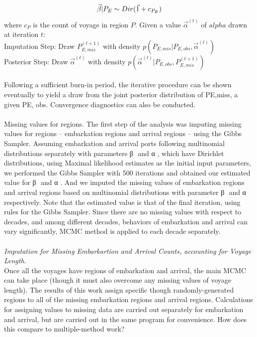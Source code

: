 \documentclass[preprint,12pt]{elsarticle}
\begin{document}
\begin{equation}
\vec{\beta}|P_E \sim Dir(\vec{1}+c_{P_E})\\
\end{equation}
where $c_P$ is the count of voyage in region $P$. Given a value $\vec{\alpha}^{(t)}$ of $alpha$ drawn at iteration $t$:\\
Imputation Step: Draw $P^{(t+1)}_{E, mis}$ with density $p(P_{E, mis}|P_{E, obs},\vec{\alpha}^{(t)})$\\
Posterior Step: Draw $\vec{\alpha}^{(t)}$ with density  $p(\vec{\alpha}^{(t)}|P_{E, obs},P^{(t+1)}_{E, mis})$\\
\\
\indent
Following a sufficient burn-in period, the iterative procedure can be shown eventually to yield a draw from the joint posterior distribution of PE,miss, a given PE, obs. Convergence diagnostics can also be conducted.\\
\\
\indent
Missing values for regions. The first step of the analysis was imputing missing values for regions -- embarkation regions and arrival regions -- using the Gibbs Sampler. Assuming embarkation and arrival ports following multinomial distributions separately with parameters β ⃗ and α ⃗, which have Dirichlet distributions, using Maximal likelihood estimates as the initial input parameters, we performed the Gibbs Sampler with 500 iterations and obtained our estimated value for β ⃗ and α ⃗. And we imputed the missing values of embarkation regions and arrival regions based on multinomial distributions with parameter β ⃗ and α ⃗ respectively. Note that the estimated value is that of the final iteration, using rules for the Gibbs Sampler.  Since there are no missing values with respect to decades, and among different decades, behaviors of embarkation and arrival can vary significantly, MCMC method is applied to each decade separately.\\
\\
\noindent
\textit{Imputation for Missing Embarkartion and Arrival Counts, accounting for Voyage Length.}\\
\indent
Once all the voyages have regions of embarkation and arrival, the main MCMC can take place (though it must also overcome any missing values of voyage length). The results of this work assign specific though randomly-generated regions to all of the missing embarkation regions and arrival regions. Calculations for assigning values to missing data are carried out separately for embarkation and arrival, but are carried out in the same program for convenience. How does this compare to multiple-method work?\\
\end{document}
